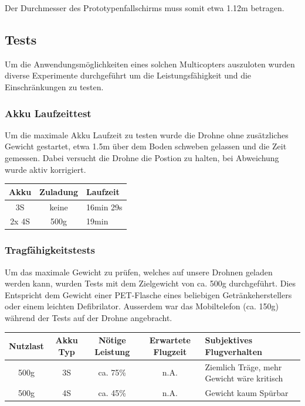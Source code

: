 Der Durchmesser des Prototypenfallschirms muss somit etwa 1.12m betragen.
\newpage
\subsection{Tests}
Um die Anwendungsmöglichkeiten eines solchen Multicopters auszuloten wurden diverse Experimente durchgeführt um die Leistungsfähigkeit und die Einschränkungen zu testen. 

\subsubsection{Akku Laufzeittest}
Um die maximale Akku Laufzeit zu testen wurde die Drohne ohne zusätzliches Gewicht gestartet, etwa 1.5m über dem Boden schweben gelassen und die Zeit gemessen. Dabei versucht die Drohne die Postion zu halten, bei Abweichung wurde aktiv korrigiert. \\

\begin{tabularx}{\textwidth}{|c|c|X|}
\hline
\textbf{Akku} & \textbf{Zuladung} & \textbf{Laufzeit} \\ \hline \hline 
3S & keine & 16min 29s\\ \hline 
2x 4S & 500g & 19min\\ \hline 
\end{tabularx}
\newpage
\subsubsection{Tragfähigkeitstests}
Um das maximale Gewicht zu prüfen, welches auf unsere Drohnen geladen werden kann, wurden Tests mit dem Zielgewicht von ca. 500g durchgeführt. Dies Entspricht dem Gewicht einer PET-Flasche eines beliebigen Getränkeherstellers oder einem leichten Defibrilator. Ausserdem war das Mobiltelefon (ca. 150g) während der Tests auf der Drohne angebracht.  \\

\begin{tabularx}{\textwidth}{|c|c|c|c|X|}
\hline
\textbf{Nutzlast} & \textbf{Akku Typ} & \textbf{Nötige Leistung }& \textbf{Erwartete Flugzeit } & \textbf{Subjektives Flugverhalten }\\
\hline \hline
500g & 3S & ca. 75\%  & n.A. & Ziemlich Träge, mehr Gewicht wäre kritisch\\\hline
500g & 4S & ca. 45\%  & n.A. & Gewicht kaum Spürbar\\
\hline
\end{tabularx}\\

